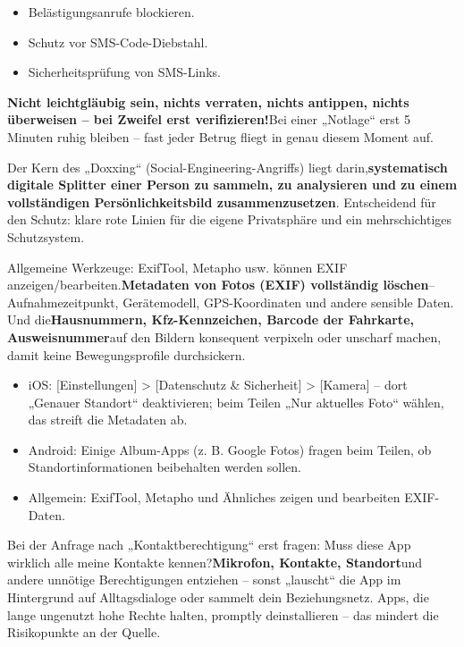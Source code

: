 
\begin{itemize}
  \item Belästigungsanrufe blockieren.
  \item Schutz vor SMS-Code-Diebstahl.
  \item Sicherheitsprüfung von SMS-Links.
\end{itemize}


\textbf{Nicht leichtgläubig sein, nichts verraten, nichts antippen, nichts überweisen – bei Zweifel erst verifizieren!}Bei einer „Notlage“ erst 5 Minuten ruhig bleiben – fast jeder Betrug fliegt in genau diesem Moment auf.


Der Kern des „Doxxing“ (Social-Engineering-Angriffs) liegt darin,\textbf{systematisch digitale Splitter einer Person zu sammeln, zu analysieren und zu einem vollständigen Persönlichkeitsbild zusammenzusetzen}. Entscheidend für den Schutz: klare rote Linien für die eigene Privatsphäre und ein mehrschichtiges Schutzsystem.


Allgemeine Werkzeuge: ExifTool, Metapho usw. können EXIF anzeigen/bearbeiten.\textbf{Metadaten von Fotos (EXIF) vollständig löschen}– Aufnahmezeitpunkt, Gerätemodell, GPS-Koordinaten und andere sensible Daten. Und die\textbf{Hausnummern, Kfz-Kennzeichen, Barcode der Fahrkarte, Ausweisnummer}auf den Bildern konsequent verpixeln oder unscharf machen, damit keine Bewegungsprofile durchsickern.

\begin{itemize}
  \item iOS: [Einstellungen] > [Datenschutz \& Sicherheit] > [Kamera] – dort „Genauer Standort“ deaktivieren; beim Teilen „Nur aktuelles Foto“ wählen, das streift die Metadaten ab.
  \item Android: Einige Album-Apps (z. B. Google Fotos) fragen beim Teilen, ob Standortinformationen beibehalten werden sollen.
  \item Allgemein: ExifTool, Metapho und Ähnliches zeigen und bearbeiten EXIF-Daten.
\end{itemize}


Bei der Anfrage nach „Kontaktberechtigung“ erst fragen: Muss diese App wirklich alle meine Kontakte kennen?\textbf{Mikrofon, Kontakte, Standort}und andere unnötige Berechtigungen entziehen – sonst „lauscht“ die App im Hintergrund auf Alltagsdialoge oder sammelt dein Beziehungsnetz. Apps, die lange ungenutzt hohe Rechte halten, promptly deinstallieren – das mindert die Risikopunkte an der Quelle.

